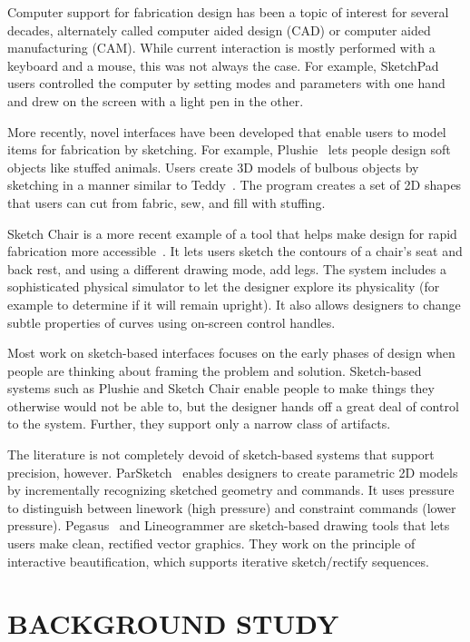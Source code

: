 \documentclass{article}
\begin{document}
Computer support for fabrication design has been a topic of interest
for several decades, alternately called computer aided design (CAD) or
computer aided manufacturing (CAM). While current interaction is
mostly performed with a keyboard and a mouse, this was not always the
case. For example, SketchPad~\cite{sutherland-sketchpad} users
controlled the computer by setting modes and parameters with one hand
and drew on the screen with a light pen in the other. 

More recently, novel interfaces have been developed that enable users
to model items for fabrication by sketching. For example,
Plushie~\cite{mori-plushie} lets people design soft objects like
stuffed animals. Users create 3D models of bulbous objects by
sketching in a manner similar to Teddy~\cite{igarashi-teddy}. The
program creates a set of 2D shapes that users can cut from fabric,
sew, and fill with stuffing. 

Sketch Chair is a more recent example of a tool that helps make design
for rapid fabrication more accessible~\cite{saul-sketch-chair}. It
lets users sketch the contours of a chair's seat and back rest, and
using a different drawing mode, add legs. The system includes a
sophisticated physical simulator to let the designer explore its
physicality (for example to determine if it will remain upright). It
also allows designers to change subtle properties of curves using
on-screen control handles.

Most work on sketch-based interfaces focuses on the early phases of
design when people are thinking about framing the problem and
solution. Sketch-based systems such as Plushie and Sketch Chair enable
people to make things they otherwise would not be able to, but the
designer hands off a great deal of control to the system. Further,
they support only a narrow class of artifacts.

The literature is not completely devoid of sketch-based systems that
support precision, however. ParSketch~\cite{naya-parsketch} enables
designers to create parametric 2D models by incrementally recognizing
sketched geometry and commands. It uses pressure to distinguish
between linework (high pressure) and constraint commands (lower
pressure). Pegasus~\cite{igarashi-pegasus} and Lineogrammer are
sketch-based drawing tools that lets users make clean, rectified
vector graphics. They work on the principle of interactive
beautification, which supports iterative sketch/rectify sequences.

\section{BACKGROUND STUDY}
\end{document}
